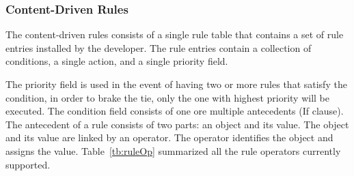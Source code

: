 \subsubsection{Content-Driven Rules}
The content-driven rules consists of a single rule table that contains a set of rule entries installed by the developer. The rule entries contain a collection of conditions, a single action, and a single priority field.

The priority field is used in the event of having two or more rules that satisfy the condition, in order to brake the tie, only the one with highest priority will be executed. The condition field consists of one ore multiple antecedents (If clause). The antecedent of a rule consists of two parts: an object and its value. The object and its value are linked by an operator. The operator identifies the object and assigns the value. Table~\ref{tb:ruleOp} summarized all the rule operators currently supported.


